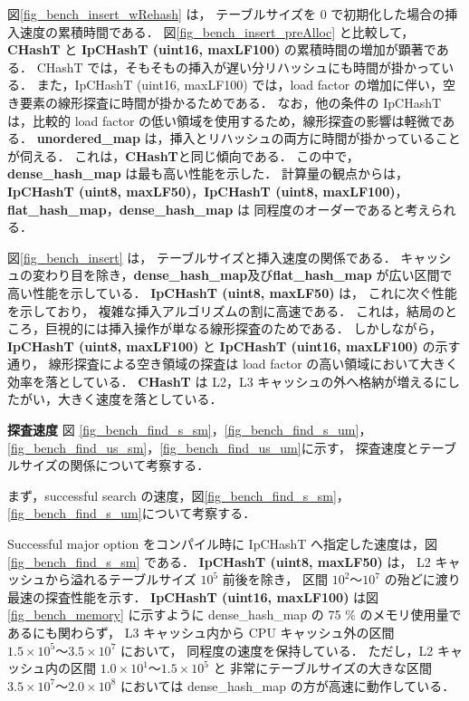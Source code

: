 図\ref{fig_bench_insert_wRehash} は，
テーブルサイズを 0 で初期化した場合の挿入速度の累積時間である．
図\ref{fig_bench_insert_preAlloc} と比較して，
{\bf CHashT} と {\bf IpCHashT (uint16, maxLF100)} の累積時間の増加が顕著である．
CHashT では，そもそもの挿入が遅い分リハッシュにも時間が掛かっている．
また，IpCHashT (uint16, maxLF100) では，load factor の増加に伴い，空き要素の線形探査に時間が掛かるためである．
なお，他の条件の IpCHashT は，比較的 load factor の低い領域を使用するため，線形探査の影響は軽微である．
{\bf unordered\_map} は，挿入とリハッシュの両方に時間が掛かっていることが伺える．
これは，{\bf CHashT}と同じ傾向である．
この中で，{\bf dense\_hash\_map} は最も高い性能を示した．
計算量の観点からは，
{\bf IpCHashT (uint8, maxLF50)}，{\bf IpCHashT (uint8, maxLF100)}，{\bf flat\_hash\_map}，{\bf dense\_hash\_map} は
同程度のオーダーであると考えられる．

図\ref{fig_bench_insert} は，
テーブルサイズと挿入速度の関係である．
キャッシュの変わり目を除き，{\bf dense\_hash\_map}及び{\bf flat\_hash\_map} が広い区間で高い性能を示している．
{\bf IpCHashT (uint8, maxLF50)} は，
これに次ぐ性能を示しており，
複雑な挿入アルゴリズムの割に高速である．
これは，結局のところ，巨視的には挿入操作が単なる線形探査のためである．
しかしながら，{\bf IpCHashT (uint8, maxLF100)} と {\bf IpCHashT (uint16, maxLF100)} の示す通り，
線形探査による空き領域の探査は load factor の高い領域において大きく効率を落としている．
{\bf CHashT} は L2，L3 キャッシュの外へ格納が増えるにしたがい，大きく速度を落としている．
\leavevmode \newline

%
{\bf 探査速度}
\samepage\newline\indent
図
\ref{fig_bench_find_s_sm}，\ref{fig_bench_find_s_um}，
\ref{fig_bench_find_us_sm}，\ref{fig_bench_find_us_um}に示す，
探査速度とテーブルサイズの関係について考察する．

まず，successful search の速度，図\ref{fig_bench_find_s_sm}，\ref{fig_bench_find_s_um}について考察する．

Successful major option をコンパイル時に IpCHashT へ指定した速度は，図\ref{fig_bench_find_s_sm} である．
{\bf IpCHashT (uint8, maxLF50)} は，
L2 キャッシュから溢れるテーブルサイズ $10^5$ 前後を除き，
区間 $10^2〜10^7$ の殆どに渡り最速の探査性能を示す．
{\bf IpCHashT (uint16, maxLF100)} は図\ref{fig_bench_memory} に示すように
dense\_hash\_map の 75 \% のメモリ使用量であるにも関わらず，
L3 キャッシュ内から CPU キャッシュ外の区間 $1.5\times10^5〜3.5\times10^7$ において，
同程度の速度を保持している．
ただし，L2 キャッシュ内の区間 $1.0\times10^1〜1.5\times10^5$ と
非常にテーブルサイズの大きな区間 $3.5\times10^7〜2.0\times10^8$ においては
dense\_hash\_map の方が高速に動作している．

